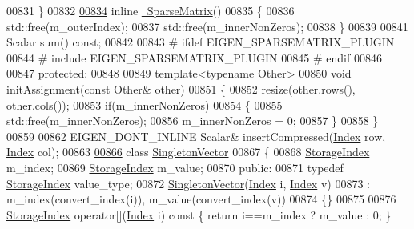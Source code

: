 \begin{DoxyCode}
00831     \}
00832 
\hyperlink{group___sparse_core___module_a36835ee4f8e5f273087910ec8063a4f6}{00834}     \textcolor{keyword}{inline} \hyperlink{group___sparse_core___module_a36835ee4f8e5f273087910ec8063a4f6}{~SparseMatrix}()
00835     \{
00836       std::free(m\_outerIndex);
00837       std::free(m\_innerNonZeros);
00838     \}
00839 
00841     Scalar sum() \textcolor{keyword}{const};
00842     
00843 \textcolor{preprocessor}{#   ifdef EIGEN\_SPARSEMATRIX\_PLUGIN}
00844 \textcolor{preprocessor}{#     include EIGEN\_SPARSEMATRIX\_PLUGIN}
00845 \textcolor{preprocessor}{#   endif}
00846 
00847 \textcolor{keyword}{protected}:
00848 
00849     \textcolor{keyword}{template}<\textcolor{keyword}{typename} Other>
00850     \textcolor{keywordtype}{void} initAssignment(\textcolor{keyword}{const} Other& other)
00851     \{
00852       resize(other.rows(), other.cols());
00853       \textcolor{keywordflow}{if}(m\_innerNonZeros)
00854       \{
00855         std::free(m\_innerNonZeros);
00856         m\_innerNonZeros = 0;
00857       \}
00858     \}
00859 
00862     EIGEN\_DONT\_INLINE Scalar& insertCompressed(\hyperlink{group___core___module_a554f30542cc2316add4b1ea0a492ff02}{Index} row, \hyperlink{group___core___module_a554f30542cc2316add4b1ea0a492ff02}{Index} col);
00863 
\hyperlink{class_eigen_1_1_sparse_matrix_1_1_singleton_vector}{00866}     \textcolor{keyword}{class }\hyperlink{class_eigen_1_1_sparse_matrix_1_1_singleton_vector}{SingletonVector}
00867     \{
00868         \hyperlink{group___sparse_core___module_a0b540ba724726ebe953f8c0df06081ed}{StorageIndex} m\_index;
00869         \hyperlink{group___sparse_core___module_a0b540ba724726ebe953f8c0df06081ed}{StorageIndex} m\_value;
00870       \textcolor{keyword}{public}:
00871         \textcolor{keyword}{typedef} \hyperlink{group___sparse_core___module_a0b540ba724726ebe953f8c0df06081ed}{StorageIndex} value\_type;
00872         \hyperlink{class_eigen_1_1_sparse_matrix_1_1_singleton_vector}{SingletonVector}(\hyperlink{group___core___module_a554f30542cc2316add4b1ea0a492ff02}{Index} i, \hyperlink{group___core___module_a554f30542cc2316add4b1ea0a492ff02}{Index} v)
00873           : m\_index(convert\_index(i)), m\_value(convert\_index(v))
00874         \{\}
00875 
00876         \hyperlink{group___sparse_core___module_a0b540ba724726ebe953f8c0df06081ed}{StorageIndex} operator[](\hyperlink{group___core___module_a554f30542cc2316add4b1ea0a492ff02}{Index} i)\textcolor{keyword}{ const }\{ \textcolor{keywordflow}{return} i==m\_index ? m\_value : 0; \}

\end{DoxyCode}
